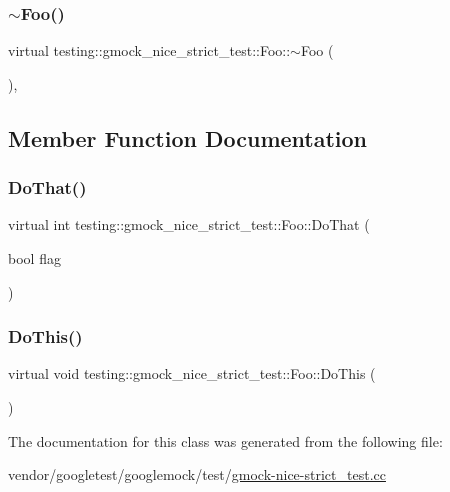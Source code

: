 \subsubsection{\texorpdfstring{$\sim$\+Foo()}{~Foo()}}
{\footnotesize\ttfamily virtual testing\+::gmock\+\_\+nice\+\_\+strict\+\_\+test\+::\+Foo\+::$\sim$\+Foo (\begin{DoxyParamCaption}{ }\end{DoxyParamCaption})\hspace{0.3cm}{\ttfamily [inline]}, {\ttfamily [virtual]}}



\subsection{Member Function Documentation}
\mbox{\label{classtesting_1_1gmock__nice__strict__test_1_1_foo_a8527a459b03f333a809a3376311a9f8b}} 
\subsubsection{\texorpdfstring{Do\+That()}{DoThat()}}
{\footnotesize\ttfamily virtual int testing\+::gmock\+\_\+nice\+\_\+strict\+\_\+test\+::\+Foo\+::\+Do\+That (\begin{DoxyParamCaption}\item[{bool}]{flag }\end{DoxyParamCaption})\hspace{0.3cm}{\ttfamily [pure virtual]}}

\mbox{\label{classtesting_1_1gmock__nice__strict__test_1_1_foo_a79a3cdbd8d9d9f6bc87580563b0d7cec}} 
\subsubsection{\texorpdfstring{Do\+This()}{DoThis()}}
{\footnotesize\ttfamily virtual void testing\+::gmock\+\_\+nice\+\_\+strict\+\_\+test\+::\+Foo\+::\+Do\+This (\begin{DoxyParamCaption}{ }\end{DoxyParamCaption})\hspace{0.3cm}{\ttfamily [pure virtual]}}



The documentation for this class was generated from the following file\+:\begin{DoxyCompactItemize}
\item 
vendor/googletest/googlemock/test/\hyperlink{gmock-nice-strict__test_8cc}{gmock-\/nice-\/strict\+\_\+test.\+cc}\end{DoxyCompactItemize}
